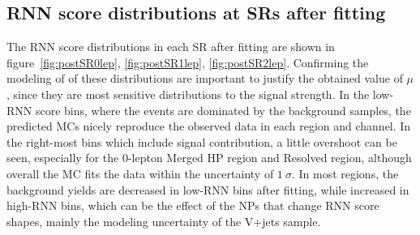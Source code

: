 \subsection{RNN score distributions at SRs after fitting}
The RNN score distributions in each SR after fitting are shown in figure~\ref{fig:postSR0lep}, \ref{fig:postSR1lep}, \ref{fig:postSR2lep}.
Confirming the modeling of of these distributions are important to justify the obtained value of $\mu$, since they are most sensitive distributions to the signal strength.
In the low-RNN score bins, where the events are dominated by the background samples, the predicted MCs nicely reproduce the observed data in each region and channel. 
In the right-most bins which include signal contribution, a little overshoot can be seen, especially for the 0-lepton Merged HP region and Resolved region, although overall the MC fits the data within the uncertainty of $1~\sigma$.
In most regions, the background yields are decreased in low-RNN bins after fitting, while increased in high-RNN bins, which can be the effect of the NPs that change RNN score shapes, mainly the modeling uncertainty of the V+jets sample. 
